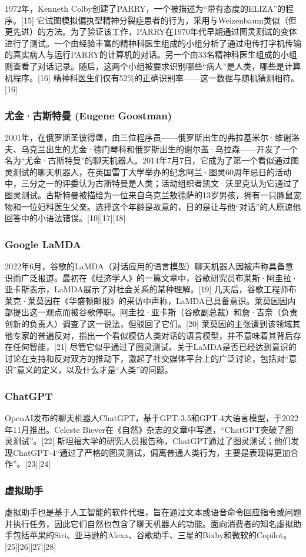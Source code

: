 1972年，Kenneth Colby创建了PARRY，一个被描述为“带有态度的ELIZA”的程序。[15] 它试图模拟偏执型精神分裂症患者的行为，采用与Weizenbaum类似（但更先进）的方法。为了验证该工作，PARRY在1970年代早期通过图灵测试的变体进行了测试。一个由经验丰富的精神科医生组成的小组分析了通过电传打字机传输的真实病人与运行PARRY的计算机的对话。另一个由33名精神科医生组成的小组则查看了对话记录。随后，这两个小组被要求识别哪些“病人”是人类，哪些是计算机程序。[16] 精神科医生们仅有52\%的正确识别率——这一数据与随机猜测相符。[16]
\subsubsection{尤金·古斯特曼 (Eugene Goostman)}  
2001年，在俄罗斯圣彼得堡，由三位程序员——俄罗斯出生的弗拉基米尔·维谢洛夫、乌克兰出生的尤金·德门琴科和俄罗斯出生的谢尔盖·乌拉森——开发了一个名为“尤金·古斯特曼”的聊天机器人。2014年7月7日，它成为了第一个看似通过图灵测试的聊天机器人，在英国雷丁大学举办的纪念阿兰·图灵60周年忌日的活动中，三分之一的评委认为古斯特曼是人类；活动组织者凯文·沃里克认为它通过了图灵测试。古斯特曼被描绘为一位来自乌克兰敖德萨的13岁男孩，拥有一只豚鼠宠物和一位妇科医生父亲。选择这个年龄是故意的，目的是让与他“对话”的人原谅他回答中的小语法错误。[10][17][18]  
\subsubsection{Google LaMDA}  
2022年6月，谷歌的LaMDA（对话应用的语言模型）聊天机器人因被声称具备意识而广泛报道。最初在《经济学人》的一篇文章中，谷歌研究员布莱斯·阿圭拉·亚卡斯表示，LaMDA展示了对社会关系的某种理解。[19] 几天后，谷歌工程师布莱克·莱莫因在《华盛顿邮报》的采访中声称，LaMDA已具备意识。莱莫因因内部提出这一观点而被谷歌停职。阿圭拉·亚卡斯（谷歌副总裁）和詹·吉奈（负责创新的负责人）调查了这一说法，但驳回了它们。[20] 莱莫因的主张遭到该领域其他专家的普遍反对，指出一个看似模仿人类对话的语言模型，并不意味着其背后存在任何智能，[21] 尽管它似乎通过了图灵测试。关于LaMDA是否已经达到意识的讨论在支持和反对双方的推动下，激起了社交媒体平台上的广泛讨论，包括对“意识”意义的定义，以及什么才是“人类”的问题。
\subsubsection{ChatGPT}   
OpenAI发布的聊天机器人ChatGPT，基于GPT-3.5和GPT-4大语言模型，于2022年11月推出。Celeste Biever在《自然》杂志的文章中写道，“ChatGPT突破了图灵测试”。[22] 斯坦福大学的研究人员报告称，ChatGPT通过了图灵测试；他们发现ChatGPT-4“通过了严格的图灵测试，偏离普通人类行为，主要是表现得更加合作”。[23][24]
\subsubsection{虚拟助手}  
虚拟助手也是基于人工智能的软件代理，旨在通过文本或语音命令回应指令或问题并执行任务，因此它们自然也包含了聊天机器人的功能。面向消费者的知名虚拟助手包括苹果的Siri、亚马逊的Alexa、谷歌助手、三星的Bixby和微软的Copilot。[25][26][27][28]

